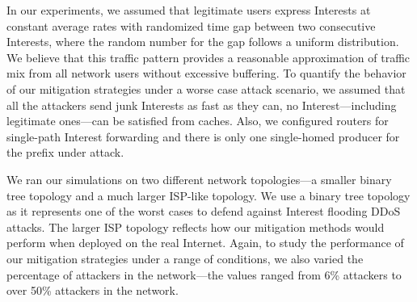 
In our experiments, we assumed that legitimate users express Interests at constant average rates with randomized time gap between two consecutive Interests, where the random number for the gap follows a uniform distribution. We believe that this traffic pattern provides a reasonable approximation of traffic mix from all network users without excessive buffering. To quantify the behavior of our mitigation strategies under a worse case attack scenario, we assumed that all the attackers send junk Interests as fast as they can, no Interest---including legitimate ones---can be satisfied from caches.  Also, we configured routers for single-path Interest forwarding and there is only one single-homed producer for the prefix under attack.



We ran our simulations on two different network topologies---a smaller binary tree topology and a much larger ISP-like topology. We use a binary tree topology as it represents one of the worst cases to defend against Interest flooding DDoS attacks. The larger ISP topology reflects how our mitigation methods would perform when deployed on the real Internet.
Again, to study the performance of our mitigation strategies under a range of conditions, we also varied the percentage of attackers in the network---the values ranged from 6\% attackers to over 50\% attackers in the network.

